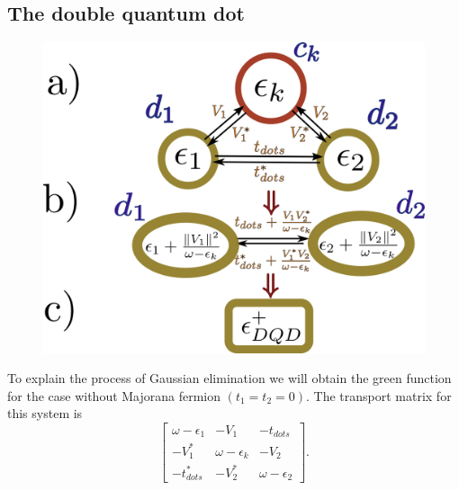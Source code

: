 \documentclass[showpacs,aps,prb,reprint,superscriptaddress]{revtex4-1}
\begin{document}
\subsection{The double quantum dot}


        \begin{figure}[t]
        \begin{center}
        \includegraphics[scale=0.25]{Graficos/Graph_DQD-Pro.png}
        \caption{ 
        }
        \label{fig:GraphsDQD}
        \end{center}
        \end{figure}




To explain the process of Gaussian elimination we will obtain the green function for the case without Majorana fermion $(t_1= t_2=0)$.  The transport matrix for this system is 
\begin{equation}
        \left[\begin{array}{ccc}
    \omega-\epsilon_{1} & -V_{1} & -t_{dots}\\
    -V_{1}^{*} & \omega-\epsilon_{k} & -V_{2}\\
    -t_{dots}^{*} & -V_{2}^{*} & \omega-\epsilon_{2}
    \end{array}\right]. \label{eq:DQDMatrix}
\end{equation}
\end{document}
